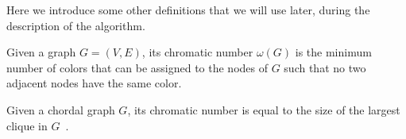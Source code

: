 Here we introduce some other definitions that we will use later, during the description of the algorithm.

\begin{definition}\label{def:chromatic}
  Given a graph $G = (V, E)$, its chromatic number $\omega(G)$ is the minimum number of colors that can be assigned to the nodes of $G$ such that no two adjacent nodes have the same color.
\end{definition}

\begin{theorem}\label{thm:chordal-chromatic}
  Given a chordal graph $G$, its chromatic number is equal to the size of the largest clique in $G$~\cite{golumbic2004algorithmic}.
\end{theorem}
